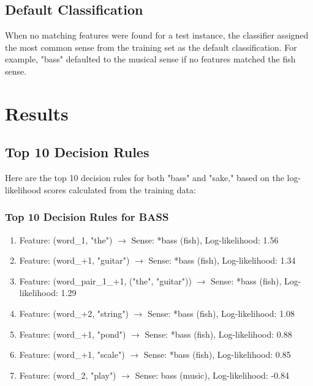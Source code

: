 \documentclass[journal,onecolumn]{IEEEtran}
\begin{document}
\subsection{Default Classification}
When no matching features were found for a test instance, the classifier assigned the most common sense from the training set as the default classification. For example, "bass" defaulted to the musical sense if no features matched the fish sense.

\section{Results}

\subsection{Top 10 Decision Rules}
Here are the top 10 decision rules for both "bass" and "sake," based on the log-likelihood scores calculated from the training data:

\subsubsection{Top 10 Decision Rules for BASS}
\begin{enumerate}
    \item Feature: (word\_1, "the") $\rightarrow$ Sense: *bass (fish), Log-likelihood: 1.56
    \item Feature: (word\_+1, "guitar") $\rightarrow$ Sense: *bass (fish), Log-likelihood: 1.34
    \item Feature: (word\_pair\_1\_+1, ("the", "guitar")) $\rightarrow$ Sense: *bass (fish), Log-likelihood: 1.29
    \item Feature: (word\_+2, "string") $\rightarrow$ Sense: *bass (fish), Log-likelihood: 1.08
    \item Feature: (word\_+1, "pond") $\rightarrow$ Sense: *bass (fish), Log-likelihood: 0.88
    \item Feature: (word\_+1, "scale") $\rightarrow$ Sense: *bass (fish), Log-likelihood: 0.85
    \item Feature: (word\_2, "play") $\rightarrow$ Sense: bass (music), Log-likelihood: -0.84
\end{enumerate}
\end{document}
